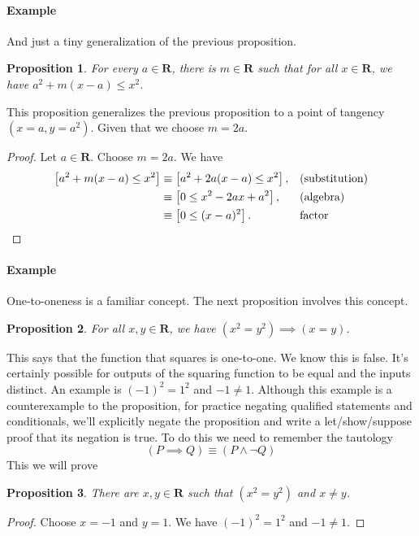 \documentclass[12pt,fleqn]{article}
\newcommand{\reals}{\mathbf{R}}
\newenvironment{myproof}
  {\begin{shaded}\begin{proof}}
  {\end{proof}\end{shaded}}
\newtheorem{prop}{Proposition}
\newcounter{ex}\setcounter{ex}{0}
\newcommand{\ex}{%
\setcounter{ex}{\value{ex}+1}
\paragraph{Example \theex}}
\begin{document}
       \ex And just a tiny generalization of the previous proposition.

     \begin{prop} For every $a \in \reals$, there is $m \in \reals$ such 
     that for all $x \in \reals$, we have $a^2 + m(x-a) \leq x^2$.
     \end{prop}
     This proposition generalizes the previous proposition to a point of tangency $(x=a,y=a^2)$. Given that we choose $m=2a$. 

      \begin{myproof} 
      Let $a \in \reals$. Choose $m=2a$. We have
      \begin{align*}
       \left[{a^2+m(x-a) \le x^2} \right]   
       &\equiv \left[a^2+2a(x-a)\le x^2\right], &&\text{(substitution)}\\
      &\equiv \left[0 \le x^2-2ax+a^2\right], &&\text{(algebra)}\\
      &\equiv \left[0 \le (x-a)^2\right]. &&\text{factor}  \qedhere
      \end{align*}
  \end{myproof}

  \ex One-to-oneness is a familiar concept. The next proposition 
  involves this concept.

     \begin{prop} For all $x,y \in \reals$, we have $(x^2 = y^2) \implies (x=y)$. 
     \end{prop} 
    \noindent This says that the function that squares is one-to-one. We know this is false. It's certainly possible for outputs of 
    the squaring function to be equal and the inputs distinct. An example is $(-1)^2 = 1^2$ and $-1 \neq 1$. Although this example
    is a counterexample to the proposition, for  practice negating qualified statements and conditionals,  we'll explicitly negate the proposition and write a let/show/suppose  proof that its negation is true.
    To do this we need to remember the tautology
    \begin{equation*}
       \left(P \implies Q\right) \equiv \left(P \land \lnot Q\right)
 \end{equation*}
   This we will prove
    \begin{prop} There are $x,y \in \reals$ such that  $(x^2 = y^2)$ and $x\neq y$. 
     \end{prop} 
     
     \begin{myproof} Choose $x=-1$ and $y=1$. We have $(-1)^2 = 1^2$ and $-1 \neq 1$.      \end{myproof}
\end{document}
